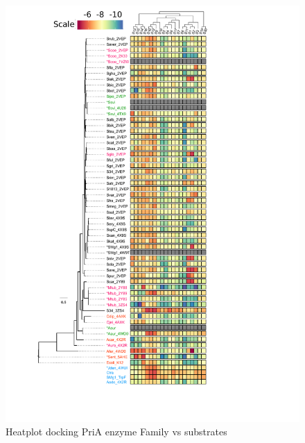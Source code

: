 \documentclass[12pt,twoside]{reedthesis}
\begin{document}
  \begin{figure}[h!tbp]
  \centering
  \includegraphics[angle = 0,scale = 1]{chapter4/Figura1_4.pdf}
  \caption[Heatplot docking PriA enzyme Family vs substrates]{\normalsize{Heatplot docking PriA enzyme Family vs substrates}}
  \label{fig:Heatplod PriA docking}
  \end{figure}
  
\end{document}
